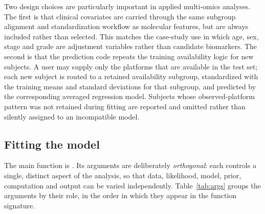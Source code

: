 \documentclass[article]{jss}
\begin{document}
Two design choices are particularly important in applied multi-omics analyses.
The first is that clinical covariates are carried through the same subgroup
alignment and standardization workflow as molecular features, but are always
included rather than selected.  This matches the case-study use in which age,
sex, stage and grade are adjustment variables rather than candidate
biomarkers.  The second is that the prediction code repeats the training
availability logic for new subjects.  A user may supply only the platforms that
are available in the test set; each new subject is routed to a retained
availability subgroup, standardized with the training means and standard
deviations for that subgroup, and predicted by the corresponding averaged
regression model.  Subjects whose observed-platform pattern was not retained
during fitting are reported and omitted rather than silently assigned to an
incompatible model.

\subsection{Fitting the model}\label{sec:fit}

The main function is . Its arguments are deliberately
\emph{orthogonal}: each controls a single, distinct aspect of the analysis, so
that data, likelihood, model, prior, computation and output can be varied
independently. Table~\ref{tab:args} groups the arguments by their role, in the
order in which they appear in the function signature.
\end{document}
